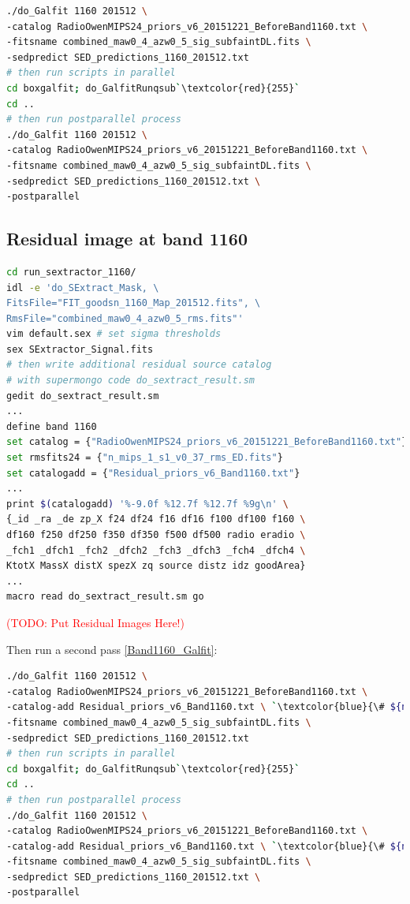 \documentclass[11pt,a4paper]{article}
\begin{document}
\begin{lstlisting}[language=bash]
./do_Galfit 1160 201512 \
-catalog RadioOwenMIPS24_priors_v6_20151221_BeforeBand1160.txt \
-fitsname combined_maw0_4_azw0_5_sig_subfaintDL.fits \
-sedpredict SED_predictions_1160_201512.txt
# then run scripts in parallel 
cd boxgalfit; do_GalfitRunqsub`\textcolor{red}{255}`
cd ..
# then run postparallel process
./do_Galfit 1160 201512 \
-catalog RadioOwenMIPS24_priors_v6_20151221_BeforeBand1160.txt \
-fitsname combined_maw0_4_azw0_5_sig_subfaintDL.fits \
-sedpredict SED_predictions_1160_201512.txt \
-postparallel
\end{lstlisting}

\subsection{Residual image at band 1160}
\label{Band1160_Galres}

\begin{lstlisting}[language=bash]
cd run_sextractor_1160/
idl -e 'do_SExtract_Mask, \
FitsFile="FIT_goodsn_1160_Map_201512.fits", \
RmsFile="combined_maw0_4_azw0_5_rms.fits"'
vim default.sex # set sigma thresholds
sex SExtractor_Signal.fits
# then write additional residual source catalog
# with supermongo code do_sextract_result.sm
gedit do_sextract_result.sm
...
define band 1160
set catalog = {"RadioOwenMIPS24_priors_v6_20151221_BeforeBand1160.txt"}
set rmsfits24 = {"n_mips_1_s1_v0_37_rms_ED.fits"}
set catalogadd = {"Residual_priors_v6_Band1160.txt"}
...
print $(catalogadd) '%-9.0f %12.7f %12.7f %9g\n' \
{_id _ra _de zp_X f24 df24 f16 df16 f100 df100 f160 \
df160 f250 df250 f350 df350 f500 df500 radio eradio \
_fch1 _dfch1 _fch2 _dfch2 _fch3 _dfch3 _fch4 _dfch4 \
KtotX MassX distX spezX zq source distz idz goodArea}
...
macro read do_sextract_result.sm go
\end{lstlisting}

\textcolor{red}{(TODO: Put Residual Images Here!)}

Then run a second pass \ref{Band1160_Galfit}: 

\begin{lstlisting}[language=bash]
./do_Galfit 1160 201512 \
-catalog RadioOwenMIPS24_priors_v6_20151221_BeforeBand1160.txt \
-catalog-add Residual_priors_v6_Band1160.txt \ `\textcolor{blue}{\# ${new!}$}`
-fitsname combined_maw0_4_azw0_5_sig_subfaintDL.fits \
-sedpredict SED_predictions_1160_201512.txt
# then run scripts in parallel 
cd boxgalfit; do_GalfitRunqsub`\textcolor{red}{255}`
cd ..
# then run postparallel process
./do_Galfit 1160 201512 \
-catalog RadioOwenMIPS24_priors_v6_20151221_BeforeBand1160.txt \
-catalog-add Residual_priors_v6_Band1160.txt \ `\textcolor{blue}{\# ${new!}$}`
-fitsname combined_maw0_4_azw0_5_sig_subfaintDL.fits \
-sedpredict SED_predictions_1160_201512.txt \
-postparallel
\end{lstlisting}
\end{document}
